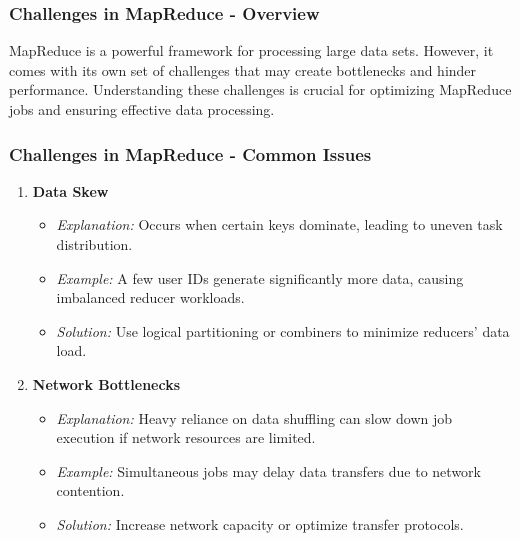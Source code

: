 \documentclass[aspectratio=169]{beamer}
\begin{document}
\begin{frame}[fragile]
    \frametitle{Challenges in MapReduce - Overview}
    MapReduce is a powerful framework for processing large data sets. However, it comes with its own set of challenges that may create bottlenecks and hinder performance. 
    Understanding these challenges is crucial for optimizing MapReduce jobs and ensuring effective data processing.
\end{frame}

\begin{frame}[fragile]
    \frametitle{Challenges in MapReduce - Common Issues}
    \begin{enumerate}
        \item \textbf{Data Skew}
        \begin{itemize}
            \item \textit{Explanation:} Occurs when certain keys dominate, leading to uneven task distribution.
            \item \textit{Example:} A few user IDs generate significantly more data, causing imbalanced reducer workloads.
            \item \textit{Solution:} Use logical partitioning or combiners to minimize reducers' data load.
        \end{itemize}
        
        \item \textbf{Network Bottlenecks}
        \begin{itemize}
            \item \textit{Explanation:} Heavy reliance on data shuffling can slow down job execution if network resources are limited.
            \item \textit{Example:} Simultaneous jobs may delay data transfers due to network contention.
            \item \textit{Solution:} Increase network capacity or optimize transfer protocols.
        \end{itemize}
    \end{enumerate}
\end{frame}
\end{document}
